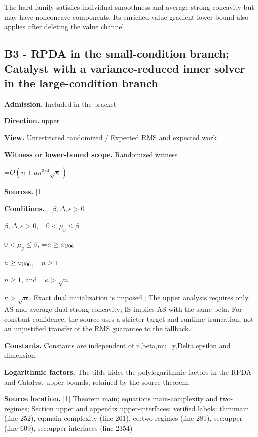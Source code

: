 \documentclass[10pt,a4paper]{article}
\newcommand{\AtlasMath}[1]{\par\begingroup\centering\setbox0=\hbox{$\displaystyle #1$}\ifdim\wd0>1.4\linewidth\typeout{ATLAS WIDE FORMULA: \the\wd0}\fi\ifdim\wd0>\linewidth\resizebox{\linewidth}{!}{\box0}\else\box0\fi\par\endgroup}
\newcommand{\AtlasInlineMath}[1]{\begingroup\setbox0=\hbox{$#1$}\ifdim\wd0>.4\linewidth\endgroup\AtlasMath{#1}\else\endgroup$#1$\fi}
\begin{document}
The hard family satisfies individual smoothness and average strong concavity but may have nonconcave components. Its enriched value-gradient lower bound also applies after deleting the value channel.



\subsection{B3 - RPDA in the small-condition branch; Catalyst with a variance-reduced inner solver in the large-condition branch}


\textbf{Admission.} Included in the bracket



\textbf{Direction.} upper



\textbf{View.} Unrestricted randomized / Expected RMS and expected work



\textbf{Witness or lower-bound scope.} Randomized witness



\AtlasMath{\widetilde O(n+a n^{3/4}\sqrt\kappa)}


\textbf{Sources.} \href{https://github.com/WU-Wendao/Colombo/blob/main/colombo_sensorium/Complexity_altas/data/sources/colombo/U06/manuscript.pdf}{[1]}



\textbf{Conditions.} \AtlasInlineMath{\beta,\Delta,\varepsilon>0}, \AtlasInlineMath{0<\mu_y\le\beta}, \AtlasInlineMath{a\ge a_{\rm U06}}, \AtlasInlineMath{n\ge1}, and \AtlasInlineMath{\kappa>\sqrt n}. Exact dual initialization is imposed.; The upper analysis requires only AS and average dual strong concavity; IS implies AS with the same beta. For constant confidence, the source uses a stricter target and runtime truncation, not an unjustified transfer of the RMS guarantee to the fallback.



\textbf{Constants.} Constants are independent of n,beta,mu\_y,Delta,epsilon and dimension.



\textbf{Logarithmic factors.} The tilde hides the polylogarithmic factors in the RPDA and Catalyst upper bounds, retained by the source theorem.



\textbf{Source location.} \href{https://github.com/WU-Wendao/Colombo/blob/main/colombo_sensorium/Complexity_altas/data/sources/colombo/U06/manuscript.pdf}{[1]} Theorem main; equations main-complexity and two-regimes; Section upper and appendix upper-interfaces; verified labels: thm:main (line 252), eq:main-complexity (line 261), eq:two-regimes (line 281), sec:upper (line 609), sec:upper-interfaces (line 2354)
\end{document}
